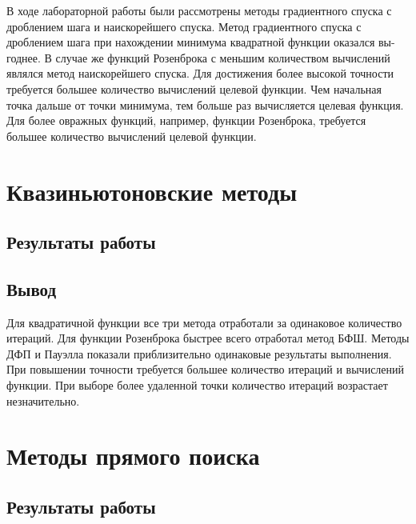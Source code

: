 \documentclass[12pt, a4paper]{article}
\begin{document}
В ходе лабораторной работы были рассмотрены методы градиентного спуска с дроблением шага и наискорейшего спуска. Метод градиентного спуска с дроблением шага при нахождении минимума квадратной функции оказался вы-годнее. В случае же функций Розенброка с меньшим количеством вычислений являлся метод наискорейшего спуска. Для достижения более высокой точности требуется большее количество вычислений целевой функции. Чем начальная точка дальше от точки минимума, тем больше раз вычисляется целевая функция. Для более овражных функций, например, функции Розенброка, требуется большее количество вычислений целевой функции.

\section{Квазиньютоновские методы}

\subsection{Результаты работы}



\vspace*{1cm}

\subsection{Вывод}

Для квадратичной функции все три метода отработали за одинаковое количество итераций. Для функции Розенброка быстрее всего отработал метод БФШ. Методы ДФП и Пауэлла показали приблизительно одинаковые результаты выполнения. При повышении точности требуется большее количество итераций и вычислений функции. При выборе более удаленной точки количество итераций возрастает незначительно.

\section{Методы прямого поиска}

\subsection{Результаты работы}



\vspace*{1cm}
\end{document}
